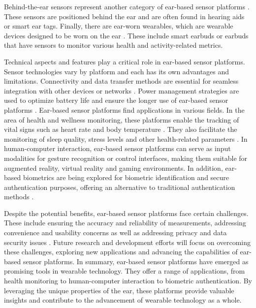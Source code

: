 Behind-the-ear sensors represent another category of ear-based sensor platforms \cite{phamWAKEBehindtheearWearable2020, gilSmartWirelessEarWorn2019, biWearableSensorEating2017}.
These sensors are positioned behind the ear and are often found in hearing aids or smart ear tags. 
Finally, there are ear-worn wearables, which are wearable devices designed to be worn on the ear \cite{biWearableSensorEating2017, gilSmartWirelessEarWorn2019}. 
These include smart earbuds or earbuds that have sensors to monitor various health and activity-related metrics.

Technical aspects and features play a critical role in ear-based sensor platforms. 
Sensor technologies vary by platform and each has its own advantages and limitations.
Connectivity and data transfer methods are essential for seamless integration with other devices or networks \cite{perezRecentAdvancesWearable2021}. 
Power management strategies are used to optimize battery life and ensure the longer use of ear-based sensor platforms \cite{nguyenInearBiosignalRecording2016}.
Ear-based sensor platforms find applications in various fields. 
In the area of health and wellness monitoring, these platforms enable the tracking of vital signs such as heart rate and body temperature \cite{roddigerRespirationRateMonitoring2020, atallahErgonomicWearableCore2018, maseHearablesNewPerspectives2020, rajbhandaryFeasibilityContinuousMonitoring2020a}.
They also facilitate the monitoring of sleep quality, stress levels and other health-related parameters \cite{luekenPhotoplethysmographybasedInearSensor2017, wendtThermoregulationExerciseHeat2007}. 
In human-computer interaction, ear-based sensor platforms can serve as input modalities for gesture recognition or control interfaces, making them suitable for augmented reality, virtual reality and gaming environments. 
In addition, ear-based biometrics are being explored for biometric identification and secure authentication purposes, offering an alternative to traditional authentication methods \cite{roddigerSensingEarablesSystematic2022a}.

Despite the potential benefits, ear-based sensor platforms face certain challenges. 
These include ensuring the accuracy and reliability of measurements, addressing convenience and usability concerns as well as addressing privacy and data security issues \cite{bockAccuracyNewInfrared2005, roddigerRespirationRateMonitoring2020, bonziAccuracyPeripheralThermometers2016, gasimAccuracyTympanicTemperature2013, amoateng-adjepongAccuracyInfraredTympanic1999a, ericksonComparisonEarbasedBladder1993, chagllae.MeasurementCoreBody2018}. 
Future research and development efforts will focus on overcoming these challenges, exploring new applications and advancing the capabilities of ear-based sensor platforms.
In summary, ear-based sensor platforms have emerged as promising tools in wearable technology. 
They offer a range of applications, from health monitoring to human-computer interaction to biometric authentication. 
By leveraging the unique properties of the ear, these platforms provide valuable insights and contribute to the advancement of wearable technology as a whole.

